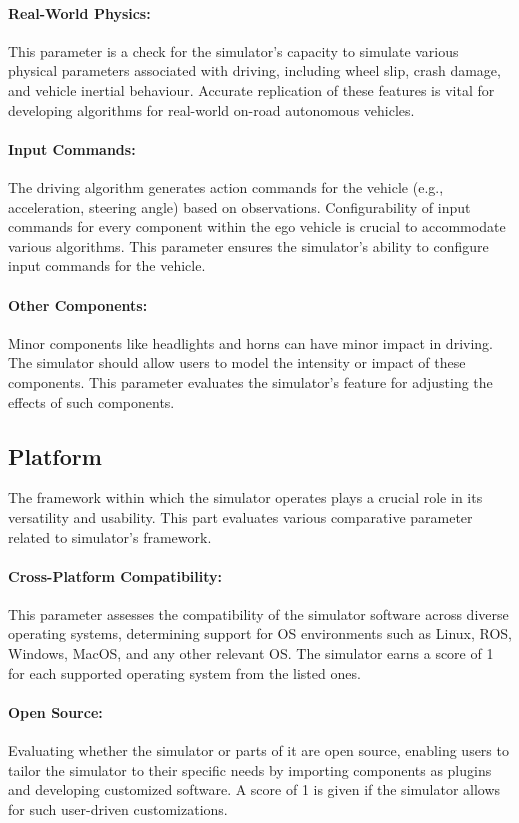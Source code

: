\documentclass[12pt,twoside,a4paper,parskip]{scrbook} %
\begin{document}
\paragraph*{Real-World Physics:}
This parameter is a check for the simulator's capacity to simulate various physical parameters associated with driving, including wheel slip, crash damage, and vehicle inertial behaviour. Accurate replication of these features is vital for developing algorithms for real-world on-road autonomous vehicles.

\paragraph*{Input Commands:}
The driving algorithm generates action commands for the vehicle (e.g., acceleration, steering angle) based on observations. Configurability of input commands for every component within the ego vehicle is crucial to accommodate various algorithms. This parameter ensures the simulator's ability to configure input commands for the vehicle.

\paragraph*{Other Components:}
Minor components like headlights and horns can have minor impact in driving. The simulator should allow users to model the intensity or impact of these components. This parameter evaluates the simulator's feature for adjusting the effects of such components.

\subsection{Platform}
The framework within which the simulator operates plays a crucial role in its versatility and usability. This part evaluates various comparative parameter related to simulator’s framework.

\paragraph*{Cross-Platform Compatibility:}
This parameter assesses the compatibility of the simulator software across diverse operating systems, determining support for OS environments such as Linux, ROS, Windows, MacOS, and any other relevant OS. The simulator earns a score of 1 for each supported operating system from the listed ones.

\paragraph*{Open Source:}
Evaluating whether the simulator or parts of it are open source, enabling users to tailor the simulator to their specific needs by importing components as plugins and developing customized software. A score of 1 is given if the simulator allows for such user-driven customizations.
\end{document}
